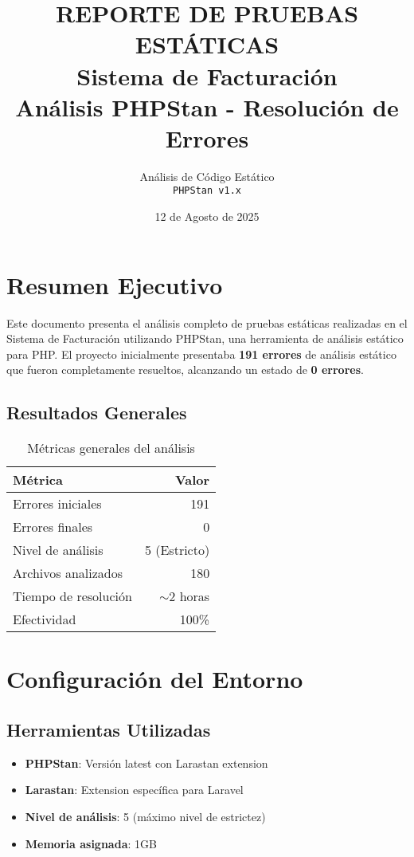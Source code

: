 \documentclass[12pt,a4paper]{article}
\title{
    \Large{\textbf{REPORTE DE PRUEBAS ESTÁTICAS}} \\
    \large{Sistema de Facturación} \\
    \normalsize{Análisis PHPStan - Resolución de Errores}
}
\author{
    Análisis de Código Estático \\
    \texttt{PHPStan v1.x}
}
\date{12 de Agosto de 2025}
\begin{document}
\maketitle

\tableofcontents
\newpage

\section{Resumen Ejecutivo}

Este documento presenta el análisis completo de pruebas estáticas realizadas en el Sistema de Facturación utilizando PHPStan, una herramienta de análisis estático para PHP. El proyecto inicialmente presentaba \textbf{191 errores} de análisis estático que fueron completamente resueltos, alcanzando un estado de \textbf{0 errores}.

\subsection{Resultados Generales}

\begin{table}[h]
\centering
\begin{tabular}{@{}lr@{}}
\toprule
\textbf{Métrica} & \textbf{Valor} \\
\midrule
Errores iniciales & 191 \\
Errores finales & 0 \\
Nivel de análisis & 5 (Estricto) \\
Archivos analizados & 180 \\
Tiempo de resolución & $\sim$2 horas \\
Efectividad & 100\% \\
\bottomrule
\end{tabular}
\caption{Métricas generales del análisis}
\end{table}

\section{Configuración del Entorno}

\subsection{Herramientas Utilizadas}

\begin{itemize}
    \item \textbf{PHPStan}: Versión latest con Larastan extension
    \item \textbf{Larastan}: Extension específica para Laravel
    \item \textbf{Nivel de análisis}: 5 (máximo nivel de estrictez)
    \item \textbf{Memoria asignada}: 1GB
\end{itemize}
\end{document}
